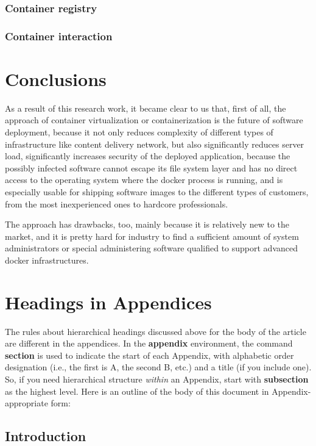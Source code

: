 \subsubsection{Container registry}

\subsubsection{Container interaction}


\section{Conclusions}

As a result of this research work, it became clear to us that, first of all,
the approach of container virtualization or containerization
is the future of software deployment, because it not only reduces complexity of
different types of infrastructure like content delivery network,
but also significantly reduces server load, significantly
increases security of the deployed application,
because the possibly infected software cannot
escape its file system layer and has no direct access
to the operating system where the docker process is running, and is
especially usable for shipping software images to the different types of customers,
from the most inexperienced ones to hardcore professionals.

The approach has drawbacks, too, mainly
because it is relatively new to the market,
and it is pretty hard for industry to find
a sufficient amount of system administrators or special
administering software qualified to support advanced docker infrastructures.



\appendix
\section{Headings in Appendices}
The rules about hierarchical headings discussed above for
the body of the article are different in the appendices.
In the \textbf{appendix} environment, the command
\textbf{section} is used to
indicate the start of each Appendix, with alphabetic order
designation (i.e., the first is A, the second B, etc.) and
a title (if you include one).  So, if you need
hierarchical structure
\textit{within} an Appendix, start with \textbf{subsection} as the
highest level. Here is an outline of the body of this
document in Appendix-appropriate form:
\subsection{Introduction}
